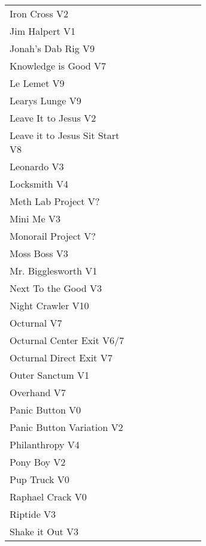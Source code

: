 \begin{flushleft}
\begin{center}
\begin{supertabular}{p{0.65\linewidth}r}
Iron Cross V2 & \pageref{vr:Iron Cross} \\
Jim Halpert V1 & \pageref{rt:Jim Halpert} \\
Jonah's Dab Rig V9 & \pageref{rt:Jonah's Dab Rig} \\
Knowledge is Good V7 & \pageref{rt:Knowledge is Good} \\
Le Lemet V9 & \pageref{rt:Le Lemet} \\
Learys Lunge V9 & \pageref{rt:Learys Lunge} \\
Leave It to Jesus V2 & \pageref{rt:Leave It to Jesus} \\
Leave it to Jesus Sit Start V8 & \pageref{vr:Leave it to Jesus Sit Start} \\
Leonardo V3 & \pageref{rt:Leonardo} \\
Locksmith V4 & \pageref{rt:Locksmith} \\
Meth Lab Project V? & \pageref{rt:Meth Lab Project} \\
Mini Me V3 & \pageref{rt:Mini Me} \\
Monorail Project V? & \pageref{rt:Monorail Project} \\
Moss Boss V3 & \pageref{rt:Moss Boss} \\
Mr. Bigglesworth V1 & \pageref{vr:Mr. Bigglesworth} \\
Next To the Good V3 & \pageref{rt:Next To the Good} \\
Night Crawler V10 & \pageref{rt:Night Crawler} \\
Octurnal V7 & \pageref{rt:Octurnal} \\
Octurnal Center Exit V6/7 & \pageref{vr:Octurnal Center Exit} \\
Octurnal Direct Exit V7 & \pageref{vr:Octurnal Direct Exit} \\
Outer Sanctum V1 & \pageref{rt:Outer Sanctum} \\
Overhand V7 & \pageref{rt:Overhand} \\
Panic Button V0 & \pageref{rt:Panic Button} \\
Panic Button Variation V2 & \pageref{vr:Panic Button Variation} \\
Philanthropy V4 & \pageref{rt:Philanthropy} \\
Pony Boy V2 & \pageref{rt:Pony Boy} \\
Pup Truck V0 & \pageref{rt:Pup Truck} \\
Raphael Crack V0 & \pageref{rt:Raphael Crack} \\
Riptide V3 & \pageref{rt:Riptide} \\
Shake it Out V3 & \pageref{vr:Shake it Out} \\

\end{supertabular}
\end{center}
\end{flushleft}
